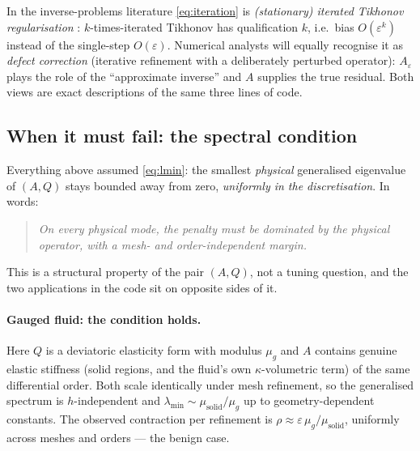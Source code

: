 \documentclass[11pt]{article}
\newcommand{\eps}{\varepsilon}
\begin{document}
In the inverse-problems literature \eqref{eq:iteration} is
\emph{(stationary) iterated Tikhonov regularisation}
\cite{Lardy1975,EnglHankeNeubauer}: $k$-times-iterated Tikhonov has
qualification $k$, i.e.\ bias $O(\eps^{k})$ instead of the single-step
$O(\eps)$. Numerical analysts will equally recognise it as \emph{defect
correction} (iterative refinement with a deliberately perturbed
operator): $A_\eps$ plays the role of the ``approximate inverse'' and
$A$ supplies the true residual. Both views are exact descriptions of
the same three lines of code.

\subsection{When it must fail: the spectral condition}
\label{sec:failure}

Everything above assumed \eqref{eq:lmin}: the smallest \emph{physical}
generalised eigenvalue of $(A, Q)$ stays bounded away from zero,
\emph{uniformly in the discretisation}. In words:
\begin{quote}
  \emph{On every physical mode, the penalty must be dominated by the
  physical operator, with a mesh- and order-independent margin.}
\end{quote}
This is a structural property of the pair $(A, Q)$, not a tuning
question, and the two applications in the code sit on opposite sides of
it.

\paragraph{Gauged fluid: the condition holds.}
Here $Q$ is a deviatoric elasticity form with modulus $\mu_{g}$ and $A$
contains genuine elastic stiffness (solid regions, and the fluid's own
$\kappa$-volumetric term) of the same differential order. Both scale
identically under mesh refinement, so the generalised spectrum is
$h$-independent and $\lambda_{\min} \sim \mu_{\mathrm{solid}}/\mu_{g}$
up to geometry-dependent constants. The observed contraction per
refinement is $\rho \approx \eps\,\mu_{g}/\mu_{\mathrm{solid}}$,
uniformly across meshes and orders --- the benign case.
\end{document}
